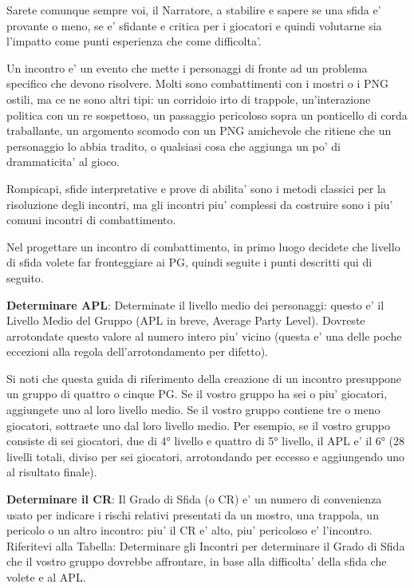 \documentclass[a4paper,11pt,twoside,openany]{book}
\begin{document}
{		Sarete comunque sempre voi, il Narratore, a stabilire e sapere se una sfida e' provante o meno, se e' sfidante e critica per i giocatori e quindi volutarne sia l'impatto come punti esperienza che come difficolta'.
		
		Un incontro e' un evento che mette i personaggi di fronte ad un problema specifico che devono risolvere. Molti sono combattimenti con i mostri o i PNG ostili, ma ce ne sono altri tipi: un corridoio irto di trappole, un'interazione politica con un re sospettoso, un passaggio pericoloso sopra un ponticello di corda traballante, un argomento scomodo con un PNG amichevole che ritiene che un personaggio lo abbia tradito, o qualsiasi cosa che aggiunga un po' di drammaticita' al gioco.
		
		Rompicapi, sfide interpretative e prove di abilita' sono i metodi classici per la risoluzione degli incontri, ma gli incontri piu' complessi da costruire sono i piu' comuni incontri di combattimento.
		
		Nel progettare un incontro di combattimento, in primo luogo decidete che livello di sfida volete far fronteggiare ai PG, quindi seguite i punti descritti qui di seguito.
		
		\textbf{Determinare APL}: Determinate il livello medio dei personaggi: questo e' il Livello Medio del Gruppo (APL in breve, Average Party Level). Dovreste arrotondate questo valore al numero intero piu' vicino (questa e' una delle poche eccezioni alla regola dell'arrotondamento per difetto).
		
		Si noti che questa guida di riferimento della creazione di un incontro presuppone un gruppo di quattro o cinque PG. Se il vostro gruppo ha sei o piu' giocatori, aggiungete uno al loro livello medio. Se il vostro gruppo contiene tre o meno giocatori, sottraete uno dal loro livello medio. Per esempio, se il vostro gruppo consiste di sei giocatori, due di 4° livello e quattro di 5° livello, il APL e' il 6° (28 livelli totali, diviso per sei giocatori, arrotondando per eccesso e aggiungendo uno al risultato finale).
		
		\textbf{Determinare il CR}: Il Grado di Sfida (o CR) e' un numero di convenienza usato per indicare i rischi relativi presentati da un mostro, una trappola, un pericolo o un altro incontro: piu' il CR e' alto, piu' pericoloso e' l'incontro. Riferitevi alla Tabella: Determinare gli Incontri per determinare il Grado di Sfida che il vostro gruppo dovrebbe affrontare, in base alla difficolta' della sfida che volete e al APL.
		
}
\end{document}
